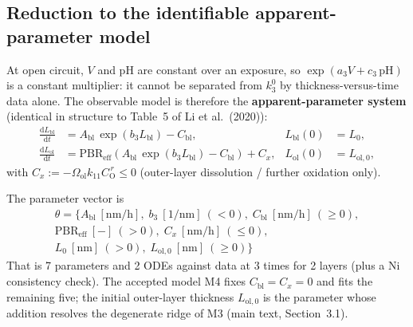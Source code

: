 \subsection{Reduction to the identifiable apparent-parameter model}
\label{sec:reduction}

At open circuit, $V$ and pH are constant over an exposure, so
$\exp(a_3 V + c_3\,\mathrm{pH})$ is a constant multiplier: it cannot be
separated from $k_3^{0}$ by thickness-versus-time data alone. The observable
model is therefore the \textbf{apparent-parameter system} (identical in
structure to Table~5 of Li et al.\ (2020)):
\begin{align}
\frac{\mathrm{d}L_{\mathrm{bl}}}{\mathrm{d}t}
&= A_{\mathrm{bl}}\, \exp(b_3 L_{\mathrm{bl}}) - C_{\mathrm{bl}} ,
& L_{\mathrm{bl}}(0) &= L_0 ,
\label{eq:app-bl} \\
\frac{\mathrm{d}L_{\mathrm{ol}}}{\mathrm{d}t}
&= \mathrm{PBR}_{\mathrm{eff}}
\left( A_{\mathrm{bl}}\, \exp(b_3 L_{\mathrm{bl}}) - C_{\mathrm{bl}} \right) + C_x ,
& L_{\mathrm{ol}}(0) &= L_{\mathrm{ol},0} ,
\label{eq:app-ol}
\end{align}
with $C_x := -\Omega_{\mathrm{ol}} k_{11} C_{\mathrm{O}}^{\,r} \le 0$
(outer-layer dissolution / further oxidation only).

The parameter vector is
\begin{multline}
\theta = \big\{
A_{\mathrm{bl}}~\mathrm{[nm/h]},\;
b_3~\mathrm{[1/nm]}\ (<0),\;
C_{\mathrm{bl}}~\mathrm{[nm/h]}\ (\ge 0),\\
\mathrm{PBR}_{\mathrm{eff}}~\mathrm{[-]}\ (>0),\;
C_x~\mathrm{[nm/h]}\ (\le 0),\\
L_0~\mathrm{[nm]}\ (>0),\;
L_{\mathrm{ol},0}~\mathrm{[nm]}\ (\ge 0)
\big\}
\end{multline}
That is 7 parameters and 2 ODEs against data at 3 times for 2 layers (plus a
Ni consistency check). The accepted model M4 fixes $C_{\mathrm{bl}} = C_x = 0$ and fits the
remaining five; the initial outer-layer thickness $L_{\mathrm{ol},0}$ is the
parameter whose addition resolves the degenerate ridge of M3 (main text,
Section~3.1).


